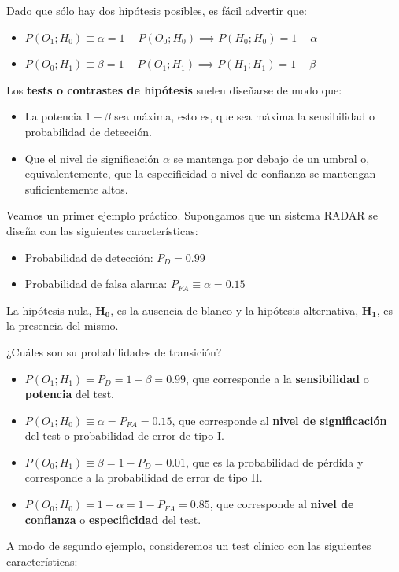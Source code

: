 \documentclass[11pt]{article}
\begin{document}
    Dado que sólo hay dos hipótesis posibles, es fácil advertir que: 
\begin{itemize}
\item \(P(O_1;H_0)\equiv\alpha = 1- P(O_0;H_0) \implies P(H_0;H_0)=1-\alpha\)
\item \(P(O_0;H_1)\equiv\beta = 1- P(O_1;H_1) \implies P(H_1;H_1)=1-\beta\)
\end{itemize}

Los \textbf{tests o contrastes de hipótesis} suelen diseñarse de modo
que: 
\begin{itemize}
\item La potencia \(1-\beta\) sea máxima, esto es, que sea máxima la
sensibilidad o probabilidad de detección. 
\item Que el nivel de
significación \(\alpha\) se mantenga por debajo de un umbral o,
equivalentemente, que la especificidad o nivel de confianza se mantengan
suficientemente altos.
\end{itemize}

    Veamos un primer ejemplo práctico. Supongamos que un sistema RADAR se
diseña con las siguientes características: 
\begin{itemize}
\item Probabilidad de detección:
\(P_D=0.99\) 
\item Probabilidad de falsa alarma: \(P_{FA}\equiv\alpha=0.15\)
\end{itemize}

La hipótesis nula, \(\mathbf{H_0}\), es la ausencia de blanco y la
hipótesis alternativa, \(\mathbf{H_1}\), es la presencia del mismo.

¿Cuáles son su probabilidades de transición? 
\begin{itemize}
\item
\(P(O_1;H_1) = P_D = 1-\beta= 0.99\), que corresponde a la
\textbf{sensibilidad} o \textbf{potencia} del test. 
\item
\(P(O_1;H_0)\equiv\alpha = P_{FA} = 0.15\), que corresponde al
\textbf{nivel de significación} del test o probabilidad de error de tipo
I. 
\item
\(P(O_0;H_1)\equiv\beta = 1-P_D = 0.01\), que es la probabilidad de
pérdida y corresponde a la probabilidad de error de tipo II. 
\item
\(P(O_0;H_0)=1-\alpha = 1-P_{FA} = 0.85\), que corresponde al
\textbf{nivel de confianza} o \textbf{especificidad} del test.
\end{itemize}

    A modo de segundo ejemplo, consideremos un test clínico con las
siguientes características:
\end{document}
